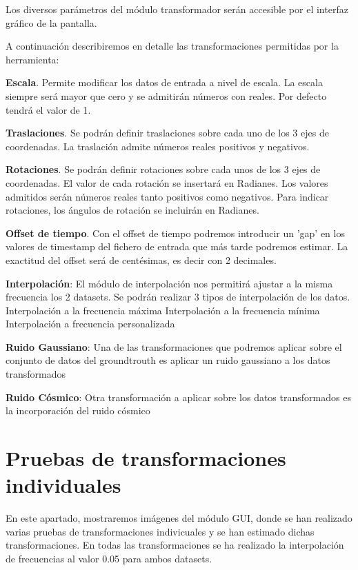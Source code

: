 Los diversos parámetros del módulo transformador serán accesible por el interfaz gráfico de la pantalla.

A continuación describiremos en detalle las transformaciones permitidas por la herramienta:

\textbf{Escala}. Permite modificar los datos de entrada a nivel de escala. La escala siempre será mayor que cero y se admitirán números con reales. Por defecto tendrá el valor de 1. 

\textbf{Traslaciones}. Se podrán definir traslaciones sobre cada uno de los 3 ejes de coordenadas. 
La traslación admite números reales positivos y negativos.

\textbf{Rotaciones}. Se podrán definir rotaciones sobre cada unos de los 3 ejes de coordenadas. El valor de cada rotación se insertará en Radianes. Los valores admitidos serán números reales tanto positivos como negativos. Para indicar rotaciones, los ángulos de rotación se incluirán en Radianes.

\textbf{Offset de tiempo}. Con el offset de tiempo podremos introducir un 'gap' en los valores de timestamp del fichero de entrada que más tarde podremos estimar. La exactitud del offset será de centésimas, es decir con 2 decimales.

\textbf{Interpolación}: El módulo de interpolación nos permitirá ajustar a la misma frecuencia los 2 datasets. Se podrán realizar 3 tipos de interpolación de los datos.
	Interpolación a la frecuencia máxima
	Interpolación a la frecuencia mínima
	Interpolación a frecuencia personalizada

\textbf{Ruido Gaussiano}: Una de las transformaciones que podremos aplicar sobre el conjunto de datos del groundtrouth es aplicar un ruido gaussiano a los datos transformados

\textbf{Ruido Cósmico}: Otra transformación a aplicar sobre los datos transformados es la incorporación del ruido cósmico


\section{Pruebas de transformaciones individuales}

En este apartado, mostraremos imágenes del módulo GUI, donde se han realizado varias pruebas de transformaciones indivicuales y se han estimado dichas transformaciones.
En todas las transformaciones se ha realizado la interpolación de frecuencias al valor 0.05 para ambos datasets.

